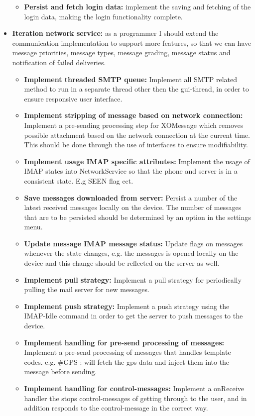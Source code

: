 \begin{itemize}
\begin{itemize}
\item{}\textbf{Persist and fetch login data:} implement the saving and fetching of the login data, making the login functionality complete.
\end{itemize}
\item{}\textbf{Iteration network service:} as a programmer I should extend the communication implementation to support more features, so that we can have message priorities, message types, message grading, message status and notification of failed deliveries.
\begin{itemize}
\item{}\textbf{Implement threaded SMTP queue:} Implement all SMTP related method to run in a separate thread other then the gui-thread, in order to ensure responsive user interface.
\item{}\textbf{Implement stripping of message based on network connection:} Implement a pre-sending processing step for XOMessage which removes possible attachment based on the network connection at the current time. This should be done through the use of interfaces to ensure modifiability. 
\item{}\textbf{Implement usage IMAP specific attributes:} Implement the usage of IMAP states into NetworkService so that the phone and server is in a consistent state. E.g SEEN flag ect. 
\item{}\textbf{Save messages downloaded from server:} Persist a number of the latest received messages locally on the device. The number of messages that are to be persisted should be determined by an option in the settings menu.
\item{}\textbf{Update message IMAP message status:} Update flags on messages whenever the state changes, e.g. the messages is opened locally on the device and this change should be reflected on the server as well.
\item{}\textbf{Implement pull strategy:} Implement a pull strategy for periodically pulling the mail server for new messages.
\item{}\textbf{Implement push strategy:} Implement a push strategy using the IMAP-Idle command in order to get the server to push messages to the device. 
\item{}\textbf{Implement handling for pre-send processing of messages:} Implement a pre-send processing of messages that handles template codes. e.g. #GPS : will fetch the gps data and inject them into the message before sending. 
\item{}\textbf{Implement handling for control-messages:} Implement a onReceive handler the stops control-messages of getting through to the user, and in addition responds to the control-message in the correct way.

\end{itemize}
\end{itemize}

